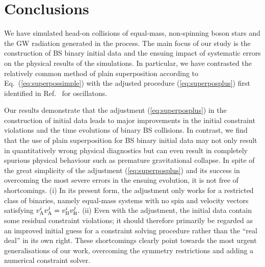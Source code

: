 \documentclass[]{iopart}
\begin{document}
\section{Conclusions}
\label{sec:conclusions}
%
We have simulated head-on collisions of equal-mass, non-spinning
boson stars and the GW radiation generated in the process.  The
main focus of our study is the construction of BS binary initial
data and the ensuing impact of systematic errors on the physical
results of the simulations. In particular, we have contrasted the
relatively common method of plain superposition according to
Eq.~(\ref{eq:superpossimple}) with the adjusted procedure
(\ref{eq:superposplus}) first identified in Ref.~\cite{Helfer:2018vtq}
for oscillatons.

Our results demonstrate that the adjustment (\ref{eq:superposplus})
in the construction of initial data leads to major improvements in
the initial constraint violations and the time evolutions of binary
BS collisions. In contrast, we find that the use of plain superposition
for BS binary initial data may not only result in quantitatively
wrong physical diagnostics but can even result in completely spurious
physical behaviour such as premature gravitational collapse. In
spite of the great simplicity of the adjustment (\ref{eq:superposplus})
and its success in overcoming the most severe errors in the ensuing
evolution, it is not free of shortcomings.  (i) In its present form,
the adjustment only works for a restricted class of binaries, namely
equal-mass systems with no spin and velocity vectors satisfying
$v_{\rm A}^i v_{\rm A}^j=v_{\rm B}^i v_{\rm B}^j$. (ii) Even with
the adjustment, the initial data contain some residual constraint
violations; it should therefore primarily be regarded as an improved
initial guess for a constraint solving procedure rather than the
``real deal'' in its own right.  These shortcomings clearly point
towards the most urgent generalisations of our work, overcoming the
symmetry restrictions and adding a numerical constraint solver.


\end{document}
